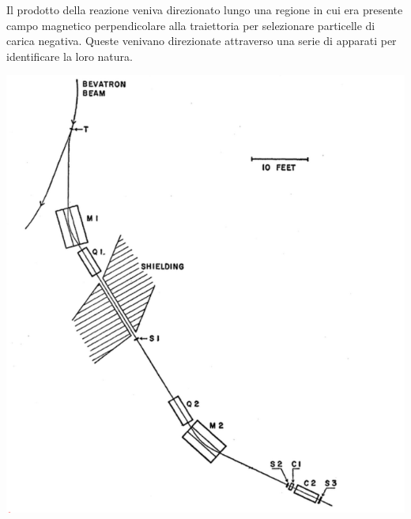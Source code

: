 \documentclass[10pt, a4paper]{scrartcl}
\numberwithin{equation}{subsection}
\theoremstyle{style1}
\begin{document}
Il prodotto della reazione veniva direzionato lungo una regione in cui era presente campo magnetico perpendicolare alla traiettoria per selezionare particelle di carica negativa. Queste venivano direzionate attraverso una serie di apparati per identificare la loro natura. 
\begin{center}
	\begin{minipage}{0.45\columnwidth}
	\centering
	\includegraphics[width=\columnwidth]{bevatron.png}
	\end{minipage}
	\hfill
	\begin{minipage}{0.45\columnwidth}
	\centering
	\begin{tabular}{l l}
		\hline\hline	


\end{tabular}
\end{minipage}
\end{center}
\end{document}
